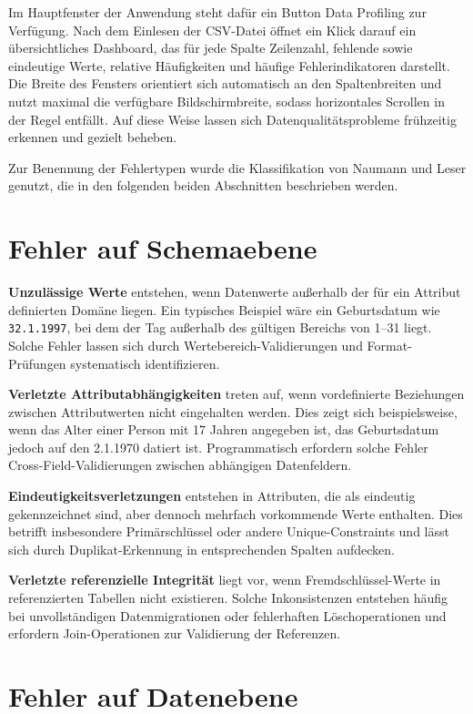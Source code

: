\documentclass[
    a4paper,
    12pt,
    headinclude=true,
    BCOR=10mm,
]{scrreprt}
\begin{document}
Im Hauptfenster der Anwendung steht dafür ein Button \glqq Data Profiling\grqq{} zur Verfügung. Nach dem Einlesen der CSV-Datei öffnet ein Klick darauf ein übersichtliches Dashboard, das für jede Spalte Zeilenzahl, fehlende sowie eindeutige Werte, relative Häufigkeiten und häufige Fehlerindikatoren darstellt. Die Breite des Fensters orientiert sich automatisch an den Spaltenbreiten und nutzt maximal die verfügbare Bildschirmbreite, sodass horizontales Scrollen in der Regel entfällt. Auf diese Weise lassen sich Datenqualitätsprobleme frühzeitig erkennen und gezielt beheben.

Zur Benennung der Fehlertypen wurde die Klassifikation von Naumann und Leser genutzt, die in den folgenden beiden Abschnitten beschrieben werden.

\section{Fehler auf Schemaebene}

\textbf{Unzulässige Werte} entstehen, wenn Datenwerte außerhalb der für ein Attribut definierten Domäne liegen. Ein typisches Beispiel wäre ein Geburtsdatum wie \texttt{32.1.1997}, bei dem der Tag außerhalb des gültigen Bereichs von 1--31 liegt. Solche Fehler lassen sich durch Wertebereich-Validierungen und Format-Prüfungen systematisch identifizieren.

\textbf{Verletzte Attributabhängigkeiten} treten auf, wenn vordefinierte Beziehungen zwischen Attributwerten nicht eingehalten werden. Dies zeigt sich beispielsweise, wenn das Alter einer Person mit 17 Jahren angegeben ist, das Geburtsdatum jedoch auf den 2.1.1970 datiert ist. Programmatisch erfordern solche Fehler Cross-Field-Validierungen zwischen abhängigen Datenfeldern.

\textbf{Eindeutigkeitsverletzungen} entstehen in Attributen, die als eindeutig gekennzeichnet sind, aber dennoch mehrfach vorkommende Werte enthalten. Dies betrifft insbesondere Primärschlüssel oder andere Unique-Constraints und lässt sich durch Duplikat-Erkennung in entsprechenden Spalten aufdecken.

\textbf{Verletzte referenzielle Integrität} liegt vor, wenn Fremdschlüssel-Werte in referenzierten Tabellen nicht existieren. Solche Inkonsistenzen entstehen häufig bei unvollständigen Datenmigrationen oder fehlerhaften Löschoperationen und erfordern Join-Operationen zur Validierung der Referenzen.

\section{Fehler auf Datenebene}
\end{document}
